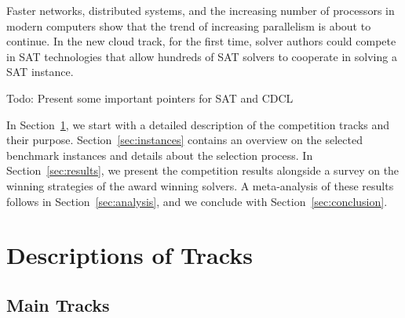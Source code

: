 \documentclass{elsarticle}
\newcommand{\todo}[1]{{\color{purple}Todo: #1}}
\begin{document}
Faster networks, distributed systems, and the increasing number of processors in modern computers show that the trend of increasing parallelism is about to continue.  
In the new cloud track, for the first time, solver authors could compete in SAT technologies that allow hundreds of SAT solvers to cooperate in solving a SAT instance. 

\todo{Present some important pointers for SAT and CDCL}

In Section~\ref{sec:tracks}, we start with a detailed description of the competition tracks and their purpose. 
Section~\ref{sec:instances} contains an overview on the selected benchmark instances and details about the selection process. 
In Section~\ref{sec:results}, we present the competition results alongside a survey on the winning strategies of the award winning solvers. 
A meta-analysis of these results follows in Section~\ref{sec:analysis}, and we conclude with Section~\ref{sec:conclusion}.



\section{Descriptions of Tracks}
\label{sec:tracks}

\subsection{Main Tracks}



\newcommand{\firsto}{\colorbox{gold}{$m^1$}}
\newcommand{\firsts}{\colorbox{gold}{$s^1$}}
\newcommand{\firstu}{\colorbox{gold}{$u^1$}}
\newcommand{\firstp}{\colorbox{gold}{$p^1$}}
\newcommand{\secondo}{\colorbox{silver}{$m^2$}}
\newcommand{\seconds}{\colorbox{silver}{$s^2$}}
\newcommand{\secondu}{\colorbox{silver}{$u^2$}}
\newcommand{\secondp}{\colorbox{silver}{$p^2$}}
\newcommand{\thirdo}{\colorbox{cupper}{$m^3$}}
\newcommand{\thirds}{\colorbox{cupper}{$s^3$}}
\newcommand{\thirdu}{\colorbox{cupper}{$u^3$}}
\newcommand{\thirdp}{\colorbox{cupper}{$p^3$}}
\end{document}
